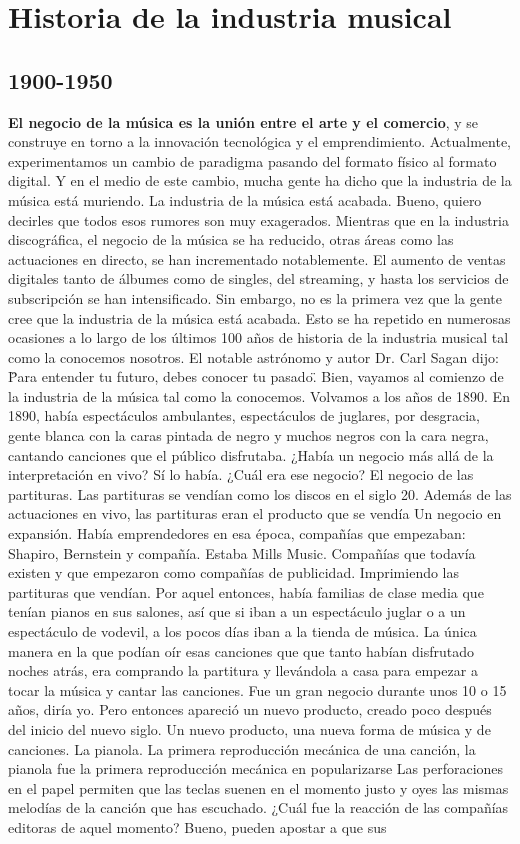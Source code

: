 \documentclass[10pt]{book}
\begin{document}
\section{Historia de la industria musical}
\subsection{1900-1950}
\textbf{El negocio de la música es la unión entre el arte y el comercio}, y se construye en torno a la innovación tecnológica  y el emprendimiento. Actualmente, experimentamos un cambio de paradigma pasando del formato físico  al formato digital. Y en el medio de este cambio, mucha gente ha dicho que la industria de la música está muriendo. La industria de la música está acabada. Bueno, quiero decirles que todos esos rumores son muy exagerados. Mientras que en la industria discográfica, el negocio de la música se ha reducido, otras áreas como las actuaciones en directo, se han incrementado notablemente. El aumento de ventas digitales tanto de álbumes como de singles, del streaming, y hasta los servicios de subscripción se han intensificado. Sin embargo, no es la primera vez que la gente cree  que la industria de la música está acabada. Esto se ha repetido en numerosas ocasiones a lo largo de los últimos 100 años de historia de la industria musical tal como la conocemos nosotros. El notable astrónomo y autor Dr. Carl Sagan dijo: \" Para entender tu futuro, debes conocer tu pasado\". Bien, vayamos al comienzo de la industria de la música tal como la conocemos. Volvamos a los años de 1890. En 1890, había espectáculos ambulantes, espectáculos de juglares, por desgracia, gente blanca con la caras pintada de negro y muchos negros con la cara negra, cantando canciones que el público disfrutaba. ¿Había un negocio más allá de la interpretación en vivo? Sí lo había. ¿Cuál era ese negocio? El negocio de las partituras. Las partituras se vendían como los discos en el siglo 20. Además de las actuaciones en vivo, las partituras eran el producto que se vendía Un negocio en expansión. Había emprendedores en esa época, compañías que empezaban: Shapiro, Bernstein y compañía. Estaba Mills Music. Compañías que todavía existen y que empezaron como compañías de publicidad. Imprimiendo  las partituras que vendían. Por aquel entonces, había familias de clase media que tenían pianos en sus salones, así que si iban a un espectáculo juglar o a un espectáculo de vodevil, a los pocos días iban a la tienda de música. La única manera en la que podían oír esas canciones que que tanto habían disfrutado noches atrás, era  comprando la partitura y llevándola a casa para empezar a tocar la música y  cantar las canciones. Fue un gran negocio durante unos 10 o 15 años, diría yo. Pero entonces apareció un nuevo producto, creado poco después del inicio del nuevo siglo. Un nuevo producto, una nueva forma de música y de canciones. La pianola. La primera reproducción mecánica de una canción, la pianola fue la primera reproducción mecánica en popularizarse Las perforaciones en el papel permiten que las teclas suenen en el momento justo y oyes las mismas melodías de la canción que has escuchado. ¿Cuál fue la reacción de las compañías editoras de aquel momento? Bueno, pueden apostar a que sus 
\end{document}
